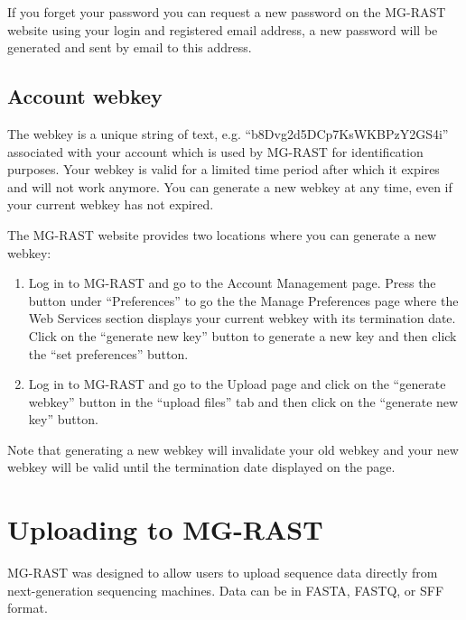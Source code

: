 \documentclass[12pt,fullpage]{report}
\begin{document}
If you forget your password you can request a new password on the MG-RAST website using your login and registered email address, a new password will
be generated and sent by email to this address.
\subsection{Account webkey}
\label{section:webkey}
The webkey is a unique string of text, e.g. ``b8Dvg2d5DCp7KsWKBPzY2GS4i'' associated with your account which is used by MG-RAST for identification
purposes. Your webkey is valid for a limited time period after which it expires and will not work anymore. You can generate a new webkey at any time, even if your current webkey has not expired.

The MG-RAST website provides two locations where you can generate a new webkey:

\begin{enumerate}
\item Log in to MG-RAST and go to the Account Management page. Press the button under ``Preferences'' to go the the Manage Preferences page where the Web Services section displays your current webkey with its termination date. Click on the ``generate new key'' button to generate a new key and then click the ``set preferences'' button.
\item Log in to MG-RAST and go to the Upload page and click on the ``generate webkey'' button in the ``upload files'' tab and then click on the ``generate new key'' button.
\end{enumerate}

\noindent
Note that generating a new webkey will invalidate your old webkey and your new webkey will be valid until the termination date displayed on the page.
\section{Uploading to MG-RAST}
\label{section:Uploading_to_MG-RAST} 

MG-RAST was designed to allow users to upload sequence data directly from next-generation sequencing machines. Data can be in FASTA, FASTQ, or SFF format.
\end{document}
